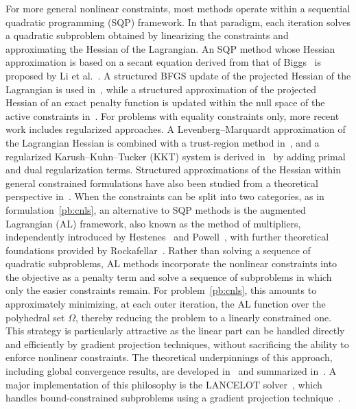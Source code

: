\documentclass[pdflatex,sn-mathphys-num]{sn-jnl}%
\theoremstyle{thmstyleone}%
\begin{document}
For more general nonlinear constraints, most methods operate within a sequential quadratic programming (SQP) framework. In that paradigm, each iteration solves a quadratic subproblem obtained by linearizing the constraints and approximating the Hessian of the Lagrangian. An SQP method whose Hessian approximation is based on a secant equation derived from that of Biggs~\cite{biggs:1977} is proposed by Li et al.~\cite{li-etal:2002}. A structured BFGS update of the projected Hessian of the Lagrangian is used in~\cite{tjoabiegler:1991}, while a structured approximation of the projected Hessian of an exact penalty function is updated within the null space of the active constraints in~\cite{amiribartels:1989}.
For problems with equality constraints only, more recent work includes regularized approaches. A Levenberg--Marquardt approximation of the Lagrangian Hessian is combined with a trust-region method in~\cite{bergou-etal:2021}, and a regularized Karush--Kuhn--Tucker (KKT) system is derived in~\cite{orbansiqueira:2020} by adding primal and dual regularization terms.
Structured approximations of the Hessian within general constrained formulations have also been studied from a theoretical perspective in~\cite{tapia:1988}.
When the constraints can be split into two categories, as in formulation~\eqref{pb:cnls}, an alternative to SQP methods is the augmented Lagrangian (AL) framework, also known as the method of multipliers, independently introduced by Hestenes~\cite{hestenes:1969} and Powell~\cite{powell:1969}, with further theoretical foundations provided by Rockafellar~\cite{rockafellar:1973}.
Rather than solving a sequence of quadratic subproblems, AL methods incorporate the nonlinear constraints into the objective as a penalty term and solve a sequence of subproblems in which only the easier constraints remain.
For problem~\eqref{pb:cnls}, this amounts to approximately minimizing, at each outer iteration, the AL function over the polyhedral set $\Omega$, thereby reducing the problem to a linearly constrained one. This strategy is particularly attractive as the linear part can be handled directly and efficiently by gradient projection techniques, without sacrificing the ability to enforce nonlinear constraints.
The theoretical underpinnings of this approach, including global convergence results, are developed in~\cite{conn-etal:1988a,conn-etal:1991, conn-etal:1993, conn-etal:1996b} and summarized in~\cite[Chapter~14]{conn-etal:2000}.
A major implementation of this philosophy is the LANCELOT solver~\cite{conn-etal:1992}, which handles bound-constrained subproblems using a gradient projection technique~\cite{conn-etal:1988b}.
\end{document}
